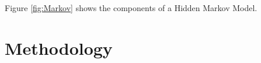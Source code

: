 \documentclass{article}
\begin{document}



Figure \ref{fig:Markov} shows the components of a Hidden Markov Model.










\section{Methodology}
\end{document}
